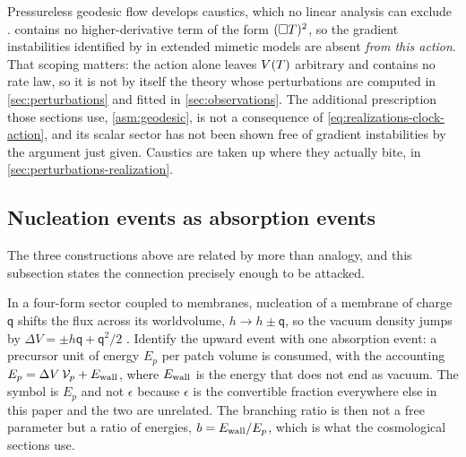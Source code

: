 Pressureless geodesic flow develops caustics, which no linear analysis can
exclude \parencite{babichev2017_170403367}. 
contains no higher-derivative term of the form $(\Box T)^2$, so the
gradient instabilities identified by \textcite{ijjas2016_160408586} in extended
mimetic models are absent \emph{from this action}. That scoping matters: the
action alone leaves $V(T)$ arbitrary and contains no rate law, so it is
not by itself the theory whose perturbations are computed in
\cref{sec:perturbations} and fitted in \cref{sec:observations}. The additional
prescription those sections use, \cref{asm:geodesic}, is not a consequence of
\cref{eq:realizations-clock-action}, and its scalar sector has not been shown
free of gradient instabilities by the argument just given. Caustics are taken up
where they actually bite, in \cref{sec:perturbations-realization}.

\subsection{Nucleation events as absorption events}\label{sec:realizations-bridge}

The three constructions above are related by more than analogy, and this
subsection states the connection precisely enough to be attacked.

In a four-form sector coupled to membranes, nucleation of a membrane of charge
$\mathsf{q}$ shifts the flux across its worldvolume, $h\to h\pm \mathsf{q}$, so
the vacuum density jumps by $\Delta V=\pm h\mathsf{q}+\mathsf{q}^2/2$
\parencite{brown1987_dynamical,brown1988_neutralization,bousso2000_hep-th0004134,kaloper2023_230502349}.
Identify the
upward event with one absorption event: a precursor unit of energy $E_p$ per
patch volume is consumed, with the accounting
$E_p=\Delta V\,\mathcal V_p+E_{\rm wall}$, where $E_{\rm wall}$ is the energy
that does not end as vacuum. The symbol is $E_p$ and not $\epsilon$ because
$\epsilon$ is the convertible fraction everywhere else in this paper and the
two are unrelated. The branching ratio is then not a free parameter but a ratio
of energies, $b=E_{\rm wall}/E_p$, which is what the cosmological sections
use.

